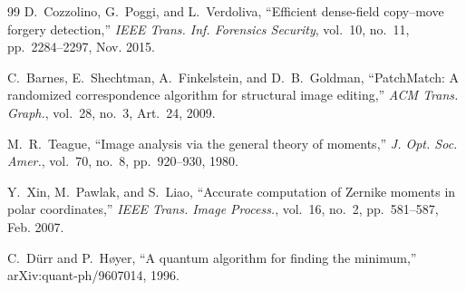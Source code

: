 \documentclass[conference]{IEEEtran}
\begin{document}
\begin{thebibliography}{99}
D.~Cozzolino, G.~Poggi, and L.~Verdoliva, ``Efficient dense-field copy--move forgery detection,'' \emph{IEEE Trans. Inf. Forensics Security}, vol.~10, no.~11, pp.~2284--2297, Nov. 2015.

C.~Barnes, E.~Shechtman, A.~Finkelstein, and D.~B.~Goldman, ``PatchMatch: A randomized correspondence algorithm for structural image editing,'' \emph{ACM Trans. Graph.}, vol.~28, no.~3, Art.~24, 2009.

M.~R.~Teague, ``Image analysis via the general theory of moments,'' \emph{J. Opt. Soc. Amer.}, vol.~70, no.~8, pp.~920--930, 1980.

Y.~Xin, M.~Pawlak, and S.~Liao, ``Accurate computation of Zernike moments in polar coordinates,'' \emph{IEEE Trans. Image Process.}, vol.~16, no.~2, pp.~581--587, Feb. 2007.

C.~D\"urr and P.~H{\o}yer, ``A quantum algorithm for finding the minimum,'' arXiv:quant-ph/9607014, 1996.

\end{thebibliography}
\end{document}
